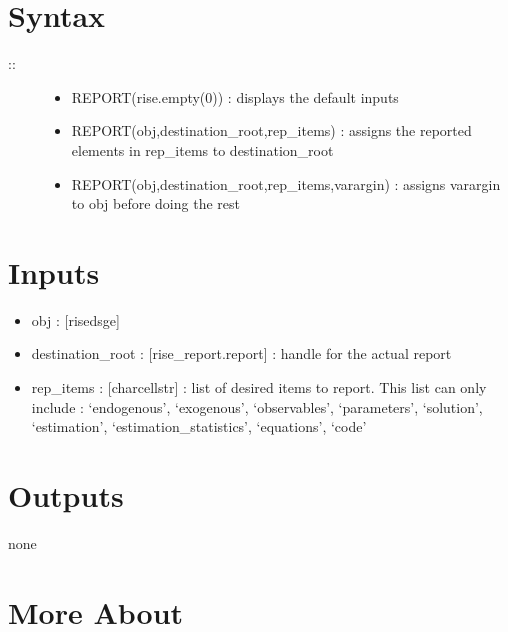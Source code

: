 \documentclass[letterpaper,10pt,english]{sphinxmanual}
\begin{document}
\section{Syntax}
\label{classes/models/@dsge/dsge:id139}\begin{description}
\item[{::}] \leavevmode\begin{itemize}
\item {} 
REPORT(rise.empty(0)) : displays the default inputs

\item {} 
REPORT(obj,destination\_root,rep\_items) : assigns the reported
elements in rep\_items to destination\_root

\item {} 
REPORT(obj,destination\_root,rep\_items,varargin) : assigns varargin to
obj before doing the rest

\end{itemize}

\end{description}


\section{Inputs}
\label{classes/models/@dsge/dsge:id140}\begin{itemize}
\item {} 
obj : {[}rise\textbar{}dsge{]}

\item {} 
destination\_root : {[}rise\_report.report{]} : handle for the actual report

\item {} 
rep\_items : {[}char\textbar{}cellstr{]} : list of desired items to report. This list
can only include : `endogenous', `exogenous', `observables',
`parameters', `solution', `estimation', `estimation\_statistics',
`equations', `code'

\end{itemize}


\section{Outputs}
\label{classes/models/@dsge/dsge:id141}
none


\section{More About}
\label{classes/models/@dsge/dsge:id142}
\end{document}
